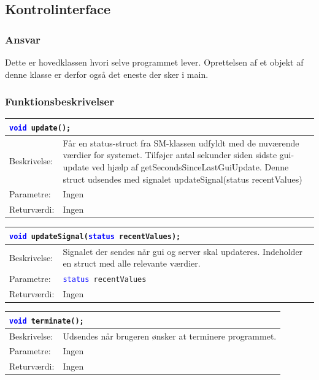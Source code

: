 \subsection{Kontrolinterface}
\subsubsection{Ansvar}
Dette er hovedklassen hvori selve programmet lever. Oprettelsen af et objekt af denne klasse er derfor også det eneste der sker i main.
\subsubsection{Funktionsbeskrivelser}

\begin{table}[H]
\begin{tabular}{l p{12.5cm}}
\multicolumn{2}{l}{\texttt{\textcolor{blue}{void} update();}} \\
\hline
Beskrivelse: &Får en status-struct fra SM-klassen udfyldt med de nuværende værdier for systemet. Tilføjer antal sekunder siden sidste gui-update ved hjælp af getSecondsSinceLastGuiUpdate. Denne struct udsendes med signalet updateSignal(status recentValues)\\
Parametre:&Ingen\\
Returværdi:&Ingen\\
\end{tabular}
\end{table}

\begin{table}[H]
\begin{tabular}{l p{12.5cm}}
\multicolumn{2}{l}{\texttt{\textcolor{blue}{void} updateSignal(\textcolor{blue}{status} recentValues);}} \\
\hline
Beskrivelse: &Signalet der sendes når gui og server skal updateres. Indeholder en struct med alle relevante værdier.\\
Parametre:&\texttt{\textcolor{blue}{status} recentValues}\\
Returværdi:&Ingen\\
\end{tabular}
\end{table}

\begin{table}[H]
\begin{tabular}{l p{12.5cm}}
\multicolumn{2}{l}{\texttt{\textcolor{blue}{void} terminate();}} \\
\hline
Beskrivelse: &Udsendes når brugeren ønsker at terminere programmet.\\
Parametre:&Ingen\\
Returværdi:&Ingen\\
\end{tabular}
\end{table}

